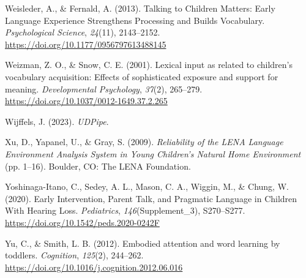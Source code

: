 \documentclass[
  man,floatsintext]{apa6}
\newlength{\cslhangindent}
\newlength{\cslentryspacingunit} %
\newenvironment{CSLReferences}[2] %
 {%
  \setlength{\parindent}{0pt}
  \ifodd #1
  \let\oldpar\par
  \def\par{\hangindent=\cslhangindent\oldpar}
  \fi
  \setlength{\parskip}{#2\cslentryspacingunit}
 }%
 {}
\begin{document}
\begin{CSLReferences}{1}{0}
\leavevmode{}%
Weisleder, A., \& Fernald, A. (2013). Talking to {Children Matters}: {Early Language Experience Strengthens Processing} and {Builds Vocabulary}. \emph{Psychological Science}, \emph{24}(11), 2143--2152. \url{https://doi.org/10.1177/0956797613488145}

\leavevmode{}%
Weizman, Z. O., \& Snow, C. E. (2001). Lexical input as related to children's vocabulary acquisition: Effects of sophisticated exposure and support for meaning. \emph{Developmental Psychology}, \emph{37}(2), 265--279. \url{https://doi.org/10.1037/0012-1649.37.2.265}

\leavevmode{}%
Wijffels, J. (2023). \emph{{UDPipe}}.

\leavevmode{}%
Xu, D., Yapanel, U., \& Gray, S. (2009). \emph{Reliability of the {LENA Language Environment Analysis System} in {Young Children}'s {Natural Home Environment}} (pp. 1--16). Boulder, CO: The LENA Foundation.

\leavevmode{}%
Yoshinaga-Itano, C., Sedey, A. L., Mason, C. A., Wiggin, M., \& Chung, W. (2020). Early {Intervention}, {Parent Talk}, and {Pragmatic Language} in {Children With Hearing Loss}. \emph{Pediatrics}, \emph{146}(Supplement\_3), S270--S277. \url{https://doi.org/10.1542/peds.2020-0242F}

\leavevmode{}%
Yu, C., \& Smith, L. B. (2012). Embodied attention and word learning by toddlers. \emph{Cognition}, \emph{125}(2), 244--262. \url{https://doi.org/10.1016/j.cognition.2012.06.016}

\end{CSLReferences}
\end{document}

